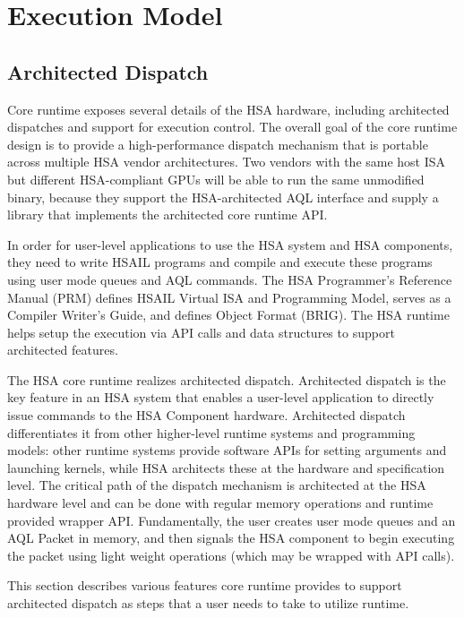 \documentclass{book}
\newcommand{\diffblock}[1]{#1}
\begin{document}
\diffblock{
\hypertarget{executionmodel}{}\section{Execution
Model}\label{executionmodel}
}
\diffblock{\hypertarget{archdispatch}{}\subsection{Architected Dispatch}
\label{archdispatch}}
Core runtime exposes several details of the HSA hardware,
including architected dispatches and support for execution control.
The overall goal of the core runtime design is to provide a
high-\/performance dispatch mechanism that is portable across
multiple HSA vendor architectures. Two vendors with the same
host ISA but different HSA-\/compliant GPUs will be able
to run the same unmodified binary, because they support the
HSA-\/architected AQL interface and supply a library
that implements the architected core runtime API.

In order for user-level applications to use the HSA system and HSA
components, they need to write HSAIL programs and compile and
execute these programs using user mode queues and AQL commands.  The
HSA Programmer’s Reference Manual (PRM) defines HSAIL Virtual ISA
and Programming Model, serves as a Compiler Writer’s Guide, and
defines Object Format (BRIG). The HSA runtime helps setup the
execution via API calls and data structures to support architected
features.

The HSA core runtime realizes architected dispatch. Architected
dispatch is the key feature in an HSA system that enables a
user-\/level application to directly issue commands to the HSA
Component hardware.  Architected dispatch differentiates it from
other higher-\/level runtime systems and programming models\-: other
runtime systems provide software APIs for setting arguments and
launching kernels, while HSA architects these at the hardware
and specification level.  The critical path of the dispatch
mechanism is architected at the HSA hardware level and can be
done with regular memory operations and runtime provided wrapper
API.  Fundamentally, the user creates user mode queues and an
AQL Packet in memory, and then signals the HSA component to
begin executing the packet using light weight operations (which may
be wrapped with API calls).

This section describes various features core runtime provides to
support architected dispatch as steps that a user needs to take to
utilize runtime.
\end{document}
